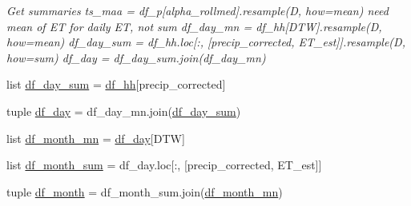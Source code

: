\begin{DoxyCompactItemize}
\begin{DoxyCompactList}\small\item\em Get summaries ts\+\_\+maa = df\+\_\+p\mbox{[}\textquotesingle{}alpha\+\_\+rollmed\textquotesingle{}\mbox{]}.resample(\textquotesingle{}D\textquotesingle{}, how=\textquotesingle{}mean\textquotesingle{}) need mean of E\+T for daily E\+T, not sum df\+\_\+day\+\_\+mn = df\+\_\+hh\mbox{[}\textquotesingle{}D\+T\+W\textquotesingle{}\mbox{]}.resample(\textquotesingle{}D\textquotesingle{}, how=\textquotesingle{}mean\textquotesingle{}) df\+\_\+day\+\_\+sum = df\+\_\+hh.\+loc\mbox{[}\+:, \mbox{[}\textquotesingle{}precip\+\_\+corrected\textquotesingle{}, \textquotesingle{}E\+T\+\_\+est\textquotesingle{}\mbox{]}\mbox{]}.resample(\textquotesingle{}D\textquotesingle{}, how=\textquotesingle{}sum\textquotesingle{}) df\+\_\+day = df\+\_\+day\+\_\+sum.\+join(df\+\_\+day\+\_\+mn) \end{DoxyCompactList}\item 
list \hyperlink{namespaces__post__process_01-_01_comments_a171d51f6d9fd3e0e8100d8a932b24f3d}{df\+\_\+day\+\_\+sum} = \hyperlink{namespaces__post__process_01-_01_comments_a799dd3cc5b8e24283cbce5d20d97168b}{df\+\_\+hh}\mbox{[}\textquotesingle{}precip\+\_\+corrected\textquotesingle{}\mbox{]}
\item 
tuple \hyperlink{namespaces__post__process_01-_01_comments_a6b0f3b1ea6c915417d9095c71f6a6d37}{df\+\_\+day} = df\+\_\+day\+\_\+mn.\+join(\hyperlink{namespaces__post__process_01-_01_comments_a171d51f6d9fd3e0e8100d8a932b24f3d}{df\+\_\+day\+\_\+sum})
\item 
list \hyperlink{namespaces__post__process_01-_01_comments_a7e79dd26fcae372621057462f779d8cc}{df\+\_\+month\+\_\+mn} = \hyperlink{namespaces__post__process_01-_01_comments_a6b0f3b1ea6c915417d9095c71f6a6d37}{df\+\_\+day}\mbox{[}\textquotesingle{}D\+T\+W\textquotesingle{}\mbox{]}
\item 
list \hyperlink{namespaces__post__process_01-_01_comments_a6b3103e90669e297e65f84e9223e0d02}{df\+\_\+month\+\_\+sum} = df\+\_\+day.\+loc\mbox{[}\+:, \mbox{[}\textquotesingle{}precip\+\_\+corrected\textquotesingle{}, \textquotesingle{}E\+T\+\_\+est\textquotesingle{}\mbox{]}\mbox{]}
\item 
tuple \hyperlink{namespaces__post__process_01-_01_comments_a0c297e8e03d58f418d0c814d57970854}{df\+\_\+month} = df\+\_\+month\+\_\+sum.\+join(\hyperlink{namespaces__post__process_01-_01_comments_a7e79dd26fcae372621057462f779d8cc}{df\+\_\+month\+\_\+mn})
\end{DoxyCompactItemize}


